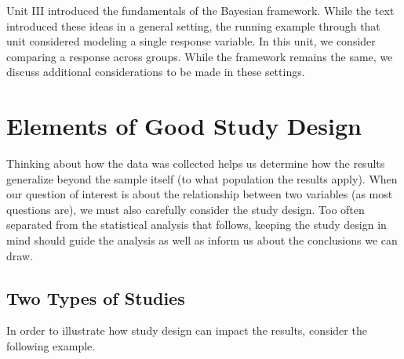 \documentclass[
  letterpaper,
  DIV=11,
  numbers=noendperiod]{scrreprt}
\theoremstyle{definition}
\theoremstyle{plain}
\theoremstyle{definition}
\theoremstyle{remark}
\begin{document}
Unit III introduced the fundamentals of the Bayesian framework. While
the text introduced these ideas in a general setting, the running
example through that unit considered modeling a single response
variable. In this unit, we consider comparing a response across groups.
While the framework remains the same, we discuss additional
considerations to be made in these settings.

\hypertarget{sec-study-design}{%
\chapter{Elements of Good Study Design}\label{sec-study-design}}

\providecommand{\norm}[1]{\lVert#1\rVert}
\providecommand{\abs}[1]{\lvert#1\rvert}
\providecommand{\iid}{\stackrel{\text{IID}}{\sim}}
\providecommand{\ind}{\stackrel{\text{Ind}}{\sim}}

\providecommand{\bm}[1]{\mathbf{#1}}
\providecommand{\bs}[1]{\boldsymbol{#1}}
\providecommand{\bbeta}{\bs{\beta}}

\providecommand{\Ell}{\mathcal{L}}
\providecommand{\indep}{\perp\negthickspace\negmedspace\perp}

Thinking about how the data was collected helps us determine how the
results generalize beyond the sample itself (to what population the
results apply). When our question of interest is about the relationship
between two variables (as most questions are), we must also carefully
consider the study design. Too often separated from the statistical
analysis that follows, keeping the study design in mind should guide the
analysis as well as inform us about the conclusions we can draw.

\hypertarget{two-types-of-studies}{%
\section{Two Types of Studies}\label{two-types-of-studies}}

In order to illustrate how study design can impact the results, consider
the following example.
\end{document}
